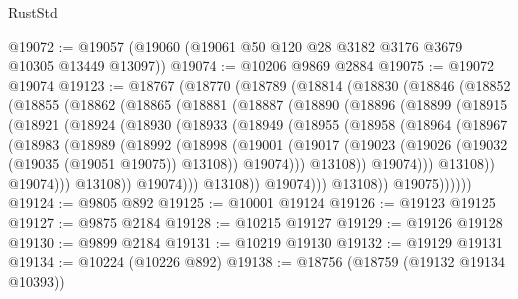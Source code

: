 \begin{lexlean}{RustStd}
\begin{coremodule}
@19072 := @19057 (@19060 (@19061 @50 @120 @28 @3182 @3176 @3679 @10305 @13449 @13097))
@19074 := @10206 @9869 @2884
@19075 := @19072 @19074
@19123 := @18767
    (@18770
      (@18789
        (@18814
          (@18830
            (@18846
              (@18852
                (@18855
                  (@18862
                    (@18865
                      (@18881
                        (@18887
                          (@18890
                            (@18896
                              (@18899
                                (@18915
                                  (@18921
                                    (@18924
                                      (@18930
                                        (@18933
                                          (@18949
                                            (@18955
                                              (@18958
                                                (@18964
                                                  (@18967
                                                    (@18983
                                                      (@18989
                                                        (@18992
                                                          (@18998
                                                            (@19001
                                                              (@19017
                                                                (@19023
                                                                  (@19026
                                                                    (@19032
                                                                      (@19035 (@19051 @19075))
                                                                      @13108))
                                                                  @19074)))
                                                            @13108))
                                                        @19074)))
                                                  @13108))
                                              @19074)))
                                        @13108))
                                    @19074)))
                              @13108))
                          @19074)))
                    @13108))
                @19075))))))
@19124 := @9805 @892
@19125 := @10001 @19124
@19126 := @19123 @19125
@19127 := @9875 @2184
@19128 := @10215 @19127
@19129 := @19126 @19128
@19130 := @9899 @2184
@19131 := @10219 @19130
@19132 := @19129 @19131
@19134 := @10224 (@10226 @892)
@19138 := @18756 (@18759 (@19132 @19134 @10393))

\end{coremodule}
\end{lexlean}
